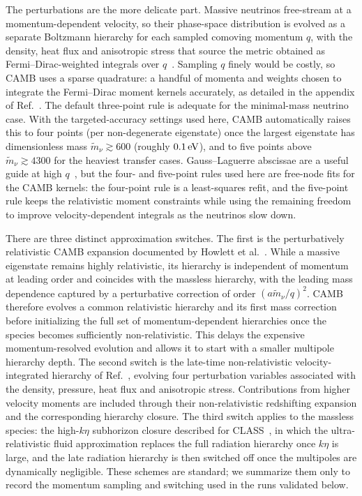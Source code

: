 \documentclass[prd, twocolumn, superscriptaddress, tightenlines, longbibliography, nofootinbib, eqsecnum, amsfonts, amsmath, floatfix, notitlepage]{revtex4-2}
\begin{document}
The perturbations are the more delicate part. Massive neutrinos free-stream at a
momentum-dependent velocity, so their phase-space distribution is evolved as a
separate Boltzmann hierarchy for each sampled comoving momentum $q$, with the
density, heat flux and anisotropic stress that source the metric obtained as
Fermi--Dirac-weighted integrals over $q$~\cite{Ma:1995ey,Lewis:2002nc}. Sampling
$q$ finely would be costly, so \textsc{CAMB} uses a sparse quadrature: a handful of
momenta and weights chosen to integrate the Fermi--Dirac moment kernels accurately,
as detailed in the appendix of Ref.~\cite{Howlett:2012mh}. The default three-point
rule is adequate for the minimal-mass neutrino case. With the targeted-accuracy
settings used here, \textsc{CAMB} automatically raises this to four points
(per non-degenerate eigenstate) once the
largest eigenstate has dimensionless mass
$\tilde m_\nu\gtrsim600$ (roughly $0.1\,{\rm eV}$), and to five
points above $\tilde m_\nu\gtrsim4300$ for the heaviest transfer
cases.
Gauss--Laguerre abscissae are a useful guide at high
$q$~\cite{Lesgourgues:2011rh}, but the four- and five-point rules used here are
free-node fits for the \textsc{CAMB} kernels: the four-point rule is a
least-squares refit, and the five-point rule keeps the relativistic moment
constraints while using the remaining freedom to improve velocity-dependent
integrals as the neutrinos slow down.

There are three distinct approximation switches. The first is the perturbatively relativistic \textsc{CAMB} expansion documented
by Howlett et al.~\cite{Howlett:2012mh}. While a massive eigenstate remains
highly relativistic, its hierarchy is independent of momentum at leading order
and coincides with the massless hierarchy, with the leading mass dependence
captured by a perturbative correction of order
$(a\tilde m_\nu/q)^2$. \textsc{CAMB} therefore evolves a common relativistic
hierarchy and its first mass correction before initializing the full set of
momentum-dependent hierarchies once the species becomes sufficiently
non-relativistic. This delays the expensive momentum-resolved evolution and
allows it to start with a smaller multipole hierarchy depth.
The second switch is the late-time non-relativistic
velocity-integrated hierarchy of Ref.~\cite{Lewis:2002nc}, evolving four
perturbation variables associated with the density,
pressure, heat flux and anisotropic stress. Contributions from higher velocity
moments are included through their non-relativistic redshifting expansion and
the corresponding hierarchy closure.
The third switch applies to the massless species: the high-$k\eta$ subhorizon
closure described for \textsc{CLASS}~\cite{Blas:2011rf}, in which the
ultra-relativistic fluid approximation replaces the full radiation hierarchy
once $k\eta$ is large, and the late radiation hierarchy is then switched off
once the multipoles are dynamically negligible. These schemes are
standard; we summarize them only to record the momentum sampling and switching
used in the runs validated below.
\end{document}
